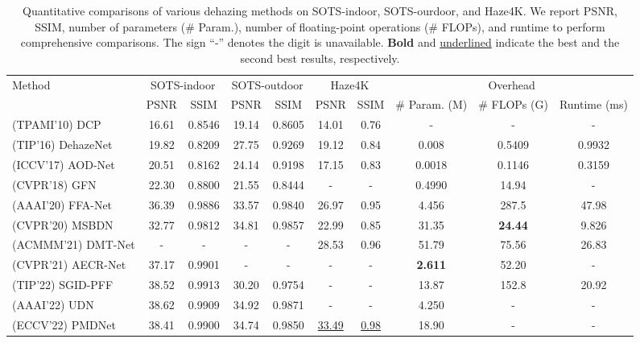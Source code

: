 \documentclass[lettersize,journal]{IEEEtran}
\begin{document}
\begin{table*}[!t]
	\footnotesize
	\centering
	\caption{Quantitative comparisons of various dehazing methods on SOTS-indoor, SOTS-ourdoor, and Haze4K. We report PSNR, SSIM, number of parameters (\# Param.), number of floating-point operations (\# FLOPs), and runtime to perform comprehensive comparisons. The sign ``-'' denotes the digit is unavailable. \textbf{Bold} and \underline{underlined} indicate the best and the second best results, respectively.}
\label{tab:benchmark}
	\begin{tabular}{l|cc|cc|cc|ccc}
		\toprule
		\multirow{2}{*}{Method} & \multicolumn{2}{c|}{SOTS-indoor \cite{li2018TIP}} & \multicolumn{2}{c|}{SOTS-outdoor \cite{li2018TIP}} & \multicolumn{2}{c|}{Haze4K \cite{liu2021ACMMM}} & \multicolumn{3}{c}{Overhead}\\
& PSNR & SSIM & PSNR & SSIM & PSNR & SSIM & \# Param. (M) & \# FLOPs (G) & Runtime (ms) \\
		\midrule
		\midrule
		(TPAMI'10) DCP \cite{he2010TPAMI} & 16.61 & 0.8546 & 19.14 & 0.8605 & 14.01 & 0.76 & - & - & - \\
		(TIP'16) DehazeNet \cite{cai2016TIP} & 19.82 & 0.8209 & 27.75 & 0.9269 & 19.12 & 0.84 & 0.008 & 0.5409 & 0.9932 \\
		(ICCV'17) AOD-Net \cite{li2017ICCV} & 20.51 & 0.8162 & 24.14 & 0.9198 & 17.15 & 0.83 & 0.0018 & 0.1146 & 0.3159 \\
		(CVPR'18) GFN \cite{ren2018CVPR} & 22.30 & 0.8800 & 21.55 & 0.8444 & - & - & 0.4990 & 14.94 & - \\
\midrule
		(AAAI'20) FFA-Net \cite{qin2020AAAI} & 36.39 & 0.9886 & 33.57 & 0.9840 & 26.97 & 0.95 & 4.456 & 287.5 & 47.98 \\
(CVPR'20) MSBDN \cite{dong2020CVPR} & 32.77 & 0.9812 & 34.81 & 0.9857 & 22.99 & 0.85 & 31.35 & \textbf{24.44} & 9.826 \\
		(ACMMM'21) DMT-Net \cite{liu2021ACMMM} & - & - & - & - & 28.53 & 0.96 & 51.79 & 75.56 & 26.83 \\
(CVPR'21) AECR-Net \cite{wu2021CVPR} & 37.17 & 0.9901 & - & - & - & - & \textbf{2.611} & 52.20 & - \\
		(TIP'22) SGID-PFF \cite{bai2022TIP} & 38.52 & 0.9913 & 30.20 & 0.9754 & - & - & 13.87 & 152.8 & 20.92 \\
		(AAAI'22) UDN \cite{hong2022AAAI} & 38.62 & 0.9909 & 34.92 & 0.9871 & - & - & 4.250 & - & - \\
		(ECCV'22) PMDNet \cite{ye2022ECCVORAL} & 38.41 & 0.9900 & 34.74 & 0.9850 & \underline{33.49} & \underline{0.98} & 18.90 & - & - \\

\end{tabular}
\end{table*}
\end{document}
